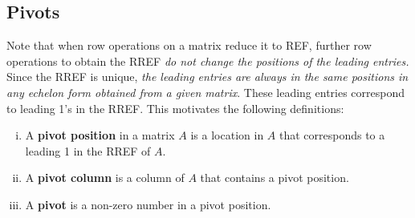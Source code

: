 \documentclass[12pt,letterpaper,reqno]{article}
\numberwithin{equation}{section}
\begin{document}
\subsection{Pivots}
Note that when row operations on a matrix reduce it to REF, further row operations to obtain the RREF \emph{do not change the positions of the leading entries.} Since the RREF is unique, \emph{the leading entries are always in the same positions in any echelon form obtained from a given matrix}. These leading entries correspond to leading 1's in the RREF. This motivates the following definitions:

\begin{defn} \label{def:pivots_pivot_positions_pivot_columns} \hspace{10cm}
	\begin{enumerate}[(i)]
	\item A {\bf pivot position} in a matrix $A$ is a location in $A$ that corresponds to a leading 1 in the RREF of $A$. 
	\item A {\bf pivot column} is a column of $A$ that contains a pivot position.
	\item A {\bf pivot} is a non-zero number in a pivot position.
\end{enumerate}
\end{defn}
\end{document}

